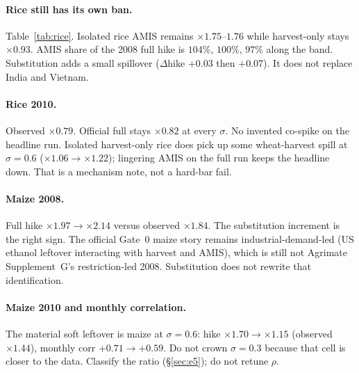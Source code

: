 \documentclass[11pt,a4paper]{article}
\begin{document}
\begin{table}[H]
\centering
\caption{Wheat isolated-leg hikes. Restriction-led means AMIS-only \(>\)
harvest-only. Source: \texttt{diagnostics/gate1\_score.csv}.}
\label{tab:wheat}
\small

\end{table}

\paragraph{Rice still has its own ban.}
Table~\ref{tab:rice}. Isolated rice AMIS remains \(\times 1.75\)--\(1.76\)
while harvest-only stays \(\times 0.93\). AMIS share of the 2008 full hike
is \(104\%\), \(100\%\), \(97\%\) along the band. Substitution adds a
small spillover (\(\Delta\)hike \(+0.03\) then \(+0.07\)). It does not
replace India and Vietnam.

\begin{table}[H]
\centering
\caption{Rice 2008 isolated legs. AMIS share \((\tau-1)/(\mathrm{full}-1)\).
Source: \texttt{diagnostics/gate1\_report.md}.}
\label{tab:rice}
\small

\end{table}

\paragraph{Rice 2010.}
Observed \(\times 0.79\). Official full stays \(\times 0.82\) at every
\(\sigma\). No invented co-spike on the headline run. Isolated harvest-only
rice does pick up some wheat-harvest spill at \(\sigma=0.6\)
(\(\times 1.06\to\times 1.22\)); lingering AMIS on the full run keeps the
headline down. That is a mechanism note, not a hard-bar fail.

\paragraph{Maize 2008.}
Full hike \(\times 1.97\to\times 2.14\) versus observed \(\times 1.84\).
The substitution increment is the right sign. The official Gate~0 maize
story remains industrial-demand-led (US ethanol leftover interacting with
harvest and AMIS), which is still not Agrimate Supplement~G's
restriction-led 2008. Substitution does not rewrite that identification.

\paragraph{Maize 2010 and monthly correlation.}
The material soft leftover is maize at \(\sigma=0.6\): hike
\(\times 1.70\to\times 1.15\) (observed \(\times 1.44\)), monthly corr
\(+0.71\to +0.59\). Do not crown \(\sigma=0.3\) because that cell is
closer to the data. Classify the ratio (\S\ref{sec:e5}); do not retune
\(\rho\).
\end{document}
